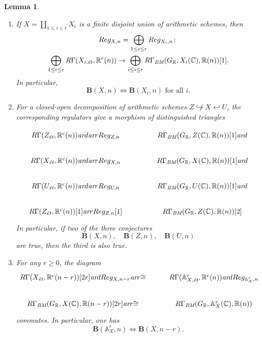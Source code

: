 \documentclass[10pt,a4paper,oneside,draft]{article}
\newcommand{\CC}{\mathbb{C}}
\newcommand{\RR}{\mathbb{R}}
\renewcommand{\AA}{\mathbb{A}}
\newcommand{\ar}{\text{\it ar}}
\newcommand{\BM}{\text{\it BM}}
\newcommand{\et}{\text{\it \'{e}t}}
\theoremstyle{myplain}
\newtheorem{lemma}[theorem]{Lemma}
\theoremstyle{mydefinition}
\numberwithin{equation}{section}
\begin{document}
\begin{lemma}
  \label{lemma:compatibility-of-B(X,n)}
  ~

  \begin{enumerate}
  \item[1)] If $X = \coprod_{1 \le i \le r} X_i$ is a finite disjoint union of
    arithmetic schemes, then
    \begin{multline*}
      Reg_{X,n} = \bigoplus_{1 \le i \le r} Reg_{X_i,n}\colon\\
      \bigoplus_{1 \le i \le r} R\Gamma (X_{i,\et}, \RR^c (n)) \to
      \bigoplus_{i \le i \le r} R\Gamma_\BM (G_\RR, X_i (\CC), \RR (n)) [1].
    \end{multline*}
    In particular,
    $$\mathbf{B} (X,n) \iff \mathbf{B} (X_i,n)\text{ for all }i.$$

  \item[2)] For a closed-open decomposition of arithmetic schemes
    $Z \not\hookrightarrow X \hookleftarrow U$, the corresponding regulators
    give a morphism of distinguished triangles

    \[ \begin{tikzcd}[column sep=4em]
        R\Gamma (Z_\et, \RR^c (n)) \ar{d}\ar{r}{Reg_{Z,n}} & R\Gamma_\BM (G_\RR, Z (\CC), \RR (n)) [1] \ar{d} \\
        R\Gamma (X_\et, \RR^c (n)) \ar{d}\ar{r}{Reg_{X,n}} & R\Gamma_\BM (G_\RR, X (\CC), \RR (n)) [1] \ar{d} \\
        R\Gamma (U_\et, \RR^c (n)) \ar{d}\ar{r}{Reg_{U,n}} & R\Gamma_\BM (G_\RR, U (\CC), \RR (n)) [1] \ar{d} \\
        R\Gamma (Z_\et, \RR^c (n)) [1]\ar{r}{Reg_{Z,n} [1]} & R\Gamma_\BM (G_\RR, Z (\CC), \RR (n)) [2]
      \end{tikzcd} \]
    In particular, if two of the three conjectures
    \[ \mathbf{B} (X,n), \quad
      \mathbf{B} (Z,n), \quad
      \mathbf{B} (U,n) \]
    are true, then the third is also true.

  \item[3)] For any $r \ge 0$, the diagram
    \[ \begin{tikzcd}
        R\Gamma (X_\et, \RR^c (n-r)) [2r] \ar{d}{Reg_{X,n-r}}\ar{r}{\cong} & R\Gamma (\AA^r_{X,\et}, \RR^c (n))\ar{d}{Reg_{\AA^r_X,n}} \\
        R\Gamma_\BM (G_\RR, X (\CC), \RR (n-r)) [2r] \ar{r}{\cong} & R\Gamma_\BM (G_\RR, \AA^r_X (\CC), \RR (n))
      \end{tikzcd} \]
    commutes. In particular, one has
    $$\mathbf{B} (\AA^r_X, n) \iff \mathbf{B} (X, n-r).$$
  \end{enumerate}


\end{lemma}
\end{document}

